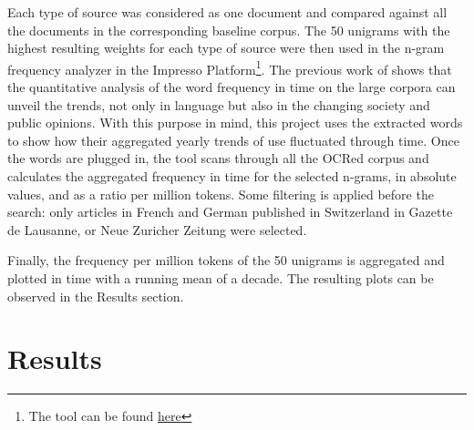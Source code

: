 \documentclass[11pt]{article}
\begin{document}
Each type of source was considered as one document and compared against all the documents in the corresponding baseline corpus. The 50 unigrams with the highest resulting weights for each type of source were then used in the n-gram frequency analyzer in the Impresso Platform\footnote{The tool can be found \href{https://impresso-project.ch/app/search/ngrams?sq=ChYIARACGAcgASoMbmF0aW9uYWxpc21l}{here}}. The previous work of \cite{Twenge2012IncreasesII} shows that the quantitative analysis of the word frequency in time on the large corpora can unveil the trends, not only in language but also in the changing society and public opinions. With this purpose in mind, this project uses the extracted words to show how their aggregated yearly trends of use fluctuated through time. Once the words are plugged in, the tool scans through all the OCRed corpus and calculates the aggregated frequency in time for the selected n-grams, in absolute values, and as a ratio per million tokens. Some filtering is applied before the search: only articles in French and German published in Switzerland in Gazette de Lausanne, or Neue Zuricher Zeitung were selected.  

Finally, the frequency per million tokens of the 50 unigrams is aggregated and plotted in time with a running mean of a decade. The resulting plots can be observed in the Results section. 

\section{Results}
\end{document}

